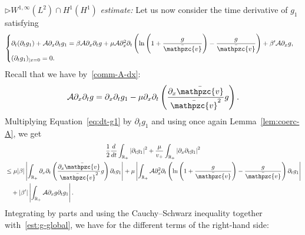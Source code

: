 \documentclass[AHL,Unicode,longabstracts,published]{cedram}
\newcommand{\R}{\mathbb{R}}
\newcommand{\bv}{\bar{\mathpzc{v}}}
\newcommand{\cA}{\mathcal A}
\begin{document}

$\rhd W^{1,\infty}(L^2)\cap H^1(H^1)$ \emph{estimate:} Let us now consider the time derivative of $g_1$ satisfying
\begin{equation}\label{eq:dt-g1}
\begin{cases}
\partial_t(\partial_t g_1) + \cA \partial_x \partial_t g_1 = \beta \cA \partial_x \partial_t g + \mu \cA \partial_x^2 \partial_t \left(\ln \left(1+ \dfrac{g}{\bv}\right) - \dfrac{g}{\bv} \right) + \beta'\cA\partial_x g, \\
(\partial_t g_1)_{|x=0} = 0.
\end{cases}
\end{equation}
Recall that we have by~\eqref{comm-A-dx}:
\[
\cA \partial_x \partial_t g = \partial_x \partial_t g_1 - \mu \partial_x \partial_t \left(\dfrac{\partial_x \bv}{\bv^2}g\right).
\]
Multiplying Equation~\eqref{eq:dt-g1} by $\partial_t g_1$ and using once again Lemma~\ref{lem:coerc-A}, we get
\begin{multline*}
 \dfrac{1}{2} \dfrac{d}{dt} \int_{\R_+} \left|\partial_t g_1\right|^2 + \dfrac{\mu}{v_+} \int_{\R_+} \left|\partial_x \partial_t g_1\right|^2 \\
\begin{aligned}
& \leq \mu |\beta| \left|\int_{\R_+} \partial_x \partial_t \left(\dfrac{\partial_x \bv}{\bv^2} g \right) \partial_t g_1 \right| + \mu \left| \int_{\R_+} \cA \partial_x^2 \partial_t \left(\ln \left(1+ \dfrac{g}{\bv}\right) - \dfrac{g}{\bv} \right) \partial_t g_1\right| \\
& \quad + |\beta'| \left| \int_{\R_+}\cA\partial_x g \partial_t g_1 \right|.
\end{aligned}
\end{multline*}
Integrating by parts and using the Cauchy--Schwarz inequality together with~\eqref{est:g-global}, we have for the different terms of the right-hand side:
\end{document}
